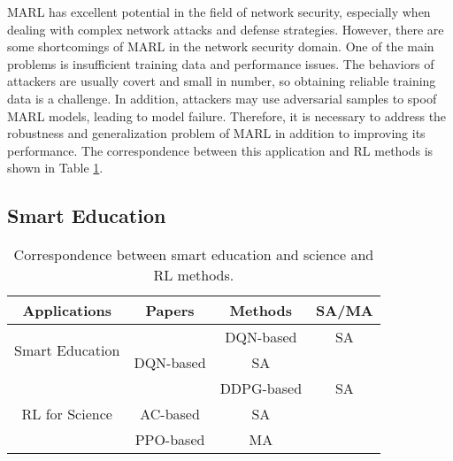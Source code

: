 \documentclass[acmsmall]{acmart}
\begin{document}
MARL has excellent potential in the field of network security, especially when dealing with complex network attacks and defense strategies. However, there are some shortcomings of MARL in the network security domain. One of the main problems is insufficient training data and performance issues. The behaviors of attackers are usually covert and small in number, so obtaining reliable training data is a challenge. In addition, attackers may use adversarial samples to spoof MARL models, leading to model failure. Therefore, it is necessary to address the robustness and generalization problem of MARL in addition to improving its performance. The correspondence between this application and RL methods is shown in Table \ref{education}.

\subsection{Smart Education}

\begin{table}[]
\centering
\caption{Correspondence between smart education and science and RL methods.}
\label{education}
\begin{tabular}{|cl|c|c|c|}
\hline
\multicolumn{2}{|c|}{Applications}                     & Papers                                    & \multicolumn{1}{c|}{Methods} & SA/MA \\ \hline
\multicolumn{2}{|c|}{\multirow{2}{*}{Smart Education}} & \cite{asee_peer_40052,9970680}            & DQN-based \cite{dqn}         & SA    \\ \cline{3-5} 
\multicolumn{2}{|c|}{}                                 & \cite{8615217,fu2022reinforcement} & DQN-based \cite{dqn}         & SA    \\ \hline
\multicolumn{2}{|c|}{\multirow{3}{*}{RL for Science}}  & \cite{seo2021feedforward}                 & DDPG-based \cite{ddpg}       & SA    \\ \cline{3-5} 
\multicolumn{2}{|c|}{}                                 & \cite{Degrave2022}                        & AC-based \cite{ac}           & SA    \\ \cline{3-5} 
\multicolumn{2}{|c|}{}                                 & \cite{Bae2022}                            & PPO-based \cite{ppo}         & MA    \\ \hline
\end{tabular}
\end{table}
\end{document}

